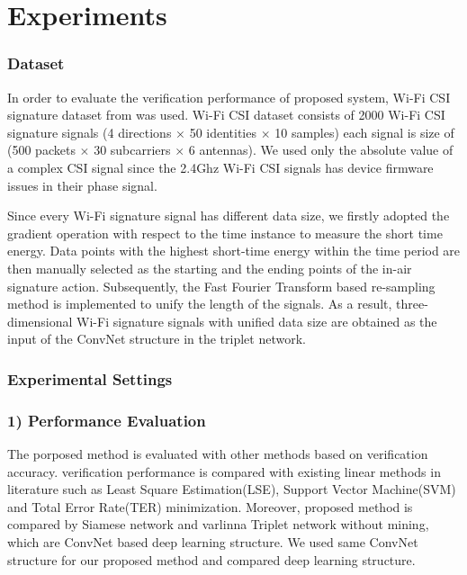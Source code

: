 \documentclass[runningheads]{llncs}
\begin{document}

\section{Experiments}

\subsubsection{Dataset}
 In order to evaluate the verification performance of proposed system, Wi-Fi CSI signature dataset from \cite{moon2017air} was used. Wi-Fi CSI dataset consists of 2000 Wi-Fi CSI signature signals (4 directions $\times$ 50 identities $\times$ 10 samples) each signal is size of (500 packets $\times$ 30 subcarriers $\times$ 6 antennas). We used only the absolute value of a complex CSI signal since the 2.4Ghz Wi-Fi CSI signals has device firmware issues in their phase signal\cite{wang2015understanding}.

 Since every Wi-Fi signature signal has different data size, we firstly adopted the gradient operation with respect to the time instance to measure the short time energy. Data points with the highest short-time energy within the time period are then manually selected as the starting and the ending points of the in-air signature action. Subsequently, the Fast Fourier Transform based re-sampling method \cite{moon2017air} is implemented to unify the length of the signals. As a result, three-dimensional Wi-Fi signature signals with unified data size are obtained as the input of the ConvNet structure in the triplet network.

\subsubsection{Experimental Settings}

\subsubsection{1) Performance Evaluation}
The porposed method is evaluated with other methods based on verification accuracy.
verification performance is compared with existing linear methods in literature such as Least Square Estimation(LSE), Support Vector Machine(SVM) and Total Error Rate(TER) minimization\cite{toh2008between}. Moreover, proposed method is compared by Siamese network\cite{koch2015siamese} and varlinna Triplet network\cite{hoffer2015deep} without mining, which are ConvNet based deep learning structure. We used same ConvNet structure for our proposed method and compared deep learning structure.
\end{document}

